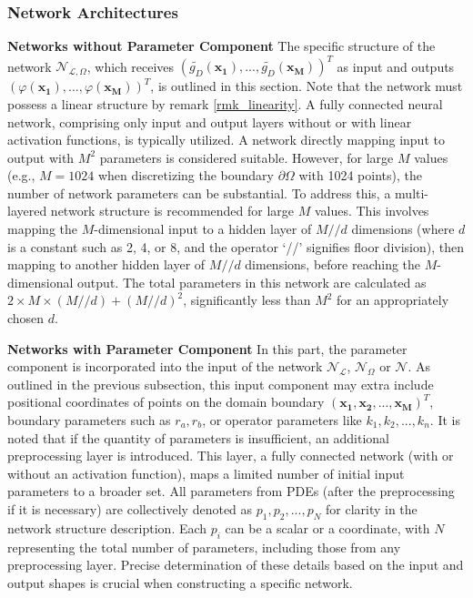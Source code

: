 \documentclass{article}
\begin{document}
\subsubsection{Network Architectures}
\textbf{Networks without Parameter Component}\hspace{0.5em}  The specific structure of the network $\mathcal{N}_{\mathcal{L}, \Omega}$, which receives $(\widetilde{g_D}(\mathbf{x_1}), ..., \widetilde{g_D}(\mathbf{x_M}))^T$ as input and outputs $(\varphi(\mathbf{x_1}), ..., \varphi(\mathbf{x_M}))^T$, is outlined in this section. Note that the network must possess a linear structure by remark \ref{rmk_linearity}. A fully connected neural network, comprising only input and output layers without or with linear activation functions, is typically utilized. A network directly mapping input to output with $M^2$ parameters is considered suitable. However, for large \(M\) values (e.g., $M = 1024$ when discretizing the boundary \(\partial \Omega\) with 1024 points), the number of network parameters can be substantial. To address this, a multi-layered network structure is recommended for large \(M\) values. This involves mapping the \(M\)-dimensional input to a hidden layer of \(M // d\) dimensions (where $d$ is a constant such as 2, 4, or 8, and the operator `//' signifies floor division), then mapping to another hidden layer of \(M // d\) dimensions, before reaching the \(M\)-dimensional output. The total parameters in this network are calculated as \(2 \times M \times (M // d) +  (M // d)^2\), significantly less than \(M^2\) for an appropriately chosen $d$.

\textbf{Networks with Parameter Component}\hspace{0.5em} In this part, the parameter component is incorporated into the input of the network $\mathcal{N}_{\mathcal{L}}$, $\mathcal{N}_{\Omega}$ or $\mathcal{N}$. As outlined in the previous subsection, this input component may extra include positional coordinates of points on the domain boundary $(\mathbf{x_1}, \mathbf{x_2}, ..., \mathbf{x_M})^T$, boundary parameters such as $r_a, r_b$, or operator parameters like $k_1, k_2, ..., k_n$. It is noted that if the quantity of parameters is insufficient, an additional preprocessing layer is introduced. This layer, a fully connected network (with or without an activation function), maps a limited number of initial input parameters to a broader set. All parameters from PDEs (after the preprocessing if it is necessary) are collectively denoted as $p_1, p_2, ..., p_N$ for clarity in the network structure description. Each $p_i$ can be a scalar or a coordinate, with $N$ representing the total number of parameters, including those from any preprocessing layer. Precise determination of these details based on the input and output shapes is crucial when constructing a specific network.
\end{document}
